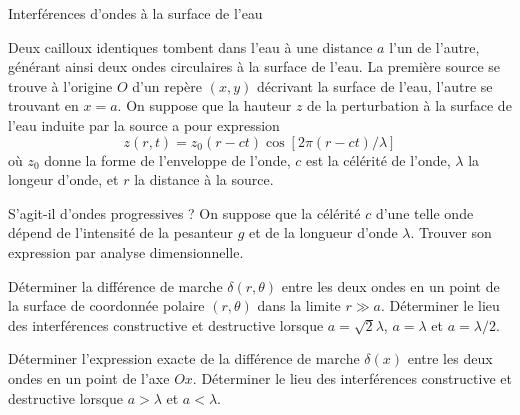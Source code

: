 \begin{exo}[MPSI]{Interférences d'ondes à la surface de l'eau}

Deux cailloux identiques tombent dans l'eau à une distance $a$ l'un de l'autre, générant ainsi deux ondes circulaires à la surface de l'eau. La première source se trouve à l'origine $O$ d'un repère $(x,y)$ décrivant la surface de l'eau, l'autre se trouvant en $x=a$. On suppose que la hauteur $z$ de la perturbation à la surface de l'eau induite par la source a pour expression
$$
z(r,t) = z_0(r-ct)\cos[2\pi(r-ct)/\lambda]
$$
où $z_0$ donne la forme de l'enveloppe de l'onde, $c$ est la célérité de l'onde, $\lambda$ la longeur d'onde, et $r$ la distance à la source.


\begin{quest}
\item S'agit-il d'ondes progressives ? On suppose que la célérité $c$ d'une telle onde dépend de l'intensité de la pesanteur $g$ et de la longueur d'onde $\lambda$. Trouver son expression par analyse dimensionnelle.



\item Déterminer la différence de marche $\delta(r,\theta)$ entre les deux ondes en un point de la surface de coordonnée polaire $(r,\theta)$ dans la limite $r \gg a$. Déterminer le lieu des interférences constructive et destructive lorsque $a=\sqrt{2}\lambda$, $a=\lambda$ et $a=\lambda/2$.



\item Déterminer l'expression exacte de la différence de marche $\delta(x)$ entre les deux ondes en un point de l'axe $Ox$. Déterminer le lieu des interférences constructive et destructive lorsque $a>\lambda$ et $a<\lambda$.


\end{quest}
\end{exo}

